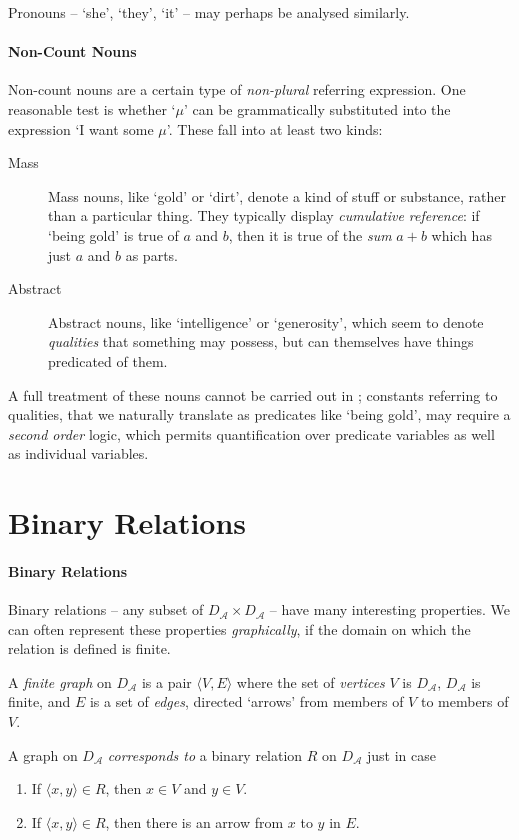 Pronouns – `she', `they', `it' – may perhaps be analysed similarly.




\paragraph{Non-Count Nouns}

Non-count nouns are a certain type of \emph{non-plural} referring expression. One reasonable test is whether `$\mu$'  can be grammatically substituted into the expression `I want some $\mu$'. 
 These fall into at least two kinds: \begin{description}
	\item [Mass] Mass nouns, like `gold' or `dirt', denote a kind of stuff or substance, rather than a particular thing. They typically display \emph{cumulative reference}: if `being gold' is true of $a$ and $b$, then it is true of the \emph{sum} $a+b$ which has just $a$ and $b$ as parts.
	\item [Abstract] Abstract nouns, like `intelligence' or `generosity', which seem to denote \emph{qualities} that something may possess, but can themselves have things predicated of them.  
\end{description}
A full treatment of these nouns cannot be carried out in \ltwo; constants referring to qualities, that we naturally translate as predicates like `being gold', may require a \emph{second order} logic, which permits quantification over predicate variables as well as individual variables. 





\section{Binary Relations}




\paragraph{Binary Relations}

Binary relations – any subset of $D_{\mathscr{A}}\times D_{\mathscr{A}}$ – have many interesting properties. We can often represent these properties \emph{graphically}, if the domain on which the relation is defined is finite.

\begin{definition}
	A \emph{finite graph} on $D_{\mathscr{A}}$ is a pair $\langle V, E\rangle$ where the set of \emph{vertices} $V$ is $D_{\mathscr{A}}$, $D_{\mathscr{A}}$ is finite, and $E$ is a set of \emph{edges}, directed `arrows' from members of $V$ to members of $V$.
\end{definition} A graph on $D_{\mathscr{A}}$ \emph{corresponds to} a binary relation $R$ on $D_{\mathscr{A}}$ just in case \begin{enumerate}
	\item If $\langle x,y\rangle \in R$, then $x\in V$ and $y \in V$.
	\item If $\langle x,y\rangle \in R$, then there is an arrow from $x$ to $y$ in $E$.
\end{enumerate}

